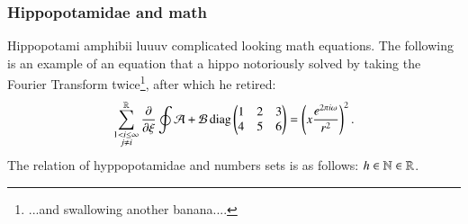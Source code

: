 \subsubsection{Hippopotamidae and math}
Hippopotami amphibii luuuv complicated looking math equations. The following is an example of an equation that a hippo notoriously solved by taking the Fourier Transform twice\footnote{...and swallowing another banana....}, after which he retired:
\begin{equation}
	\sum_{\substack{ 1 < i \leq \infty \\ j \neq i}}^{\mathbb{R}}  \frac{\partial}{\partial \xi} \oint \mathcal{A + B} \, \text{diag} \begin{pmatrix} 1 & 2 & 3 \\  4 & 5 & 6 \end{pmatrix} = \left(	x \frac{e^{2 \pi i \omega}}{r^2}	\right)^2.
\end{equation}
The relation of hyppopotamidae and numbers sets is as follows: $h \in \mathbb{N} \in \mathbb{R}$.